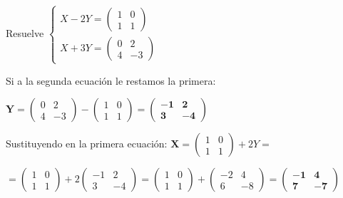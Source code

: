 \begin{ejem} Resuelve $\begin{cases} X-2Y=\left( \begin{matrix}  1&0\\1&1 \end{matrix} \right) \\ X+3Y=\left( \begin{matrix}  0&2\\4&-3 \end{matrix} \right) \end{cases}$ 

Si a la segunda ecuación le restamos la primera: 

$\boldsymbol{Y}=\left( \begin{matrix}  0&2\\4&-3 \end{matrix} \right) -\left( \begin{matrix}  1&0\\1&1 \end{matrix} \right)=\boldsymbol{ \left( \begin{matrix} -1&2 \\3&-4  \end{matrix}  \right)}$

Sustituyendo en la primera ecuación:
$\boldsymbol{ X}=\left( \begin{matrix}  1&0\\1&1 \end{matrix} \right)+2Y=$

$=\left( \begin{matrix}  1&0\\1&1 \end{matrix} \right)+2\left( \begin{matrix} -1&2 \\3&-4  \end{matrix}  \right)=
\left( \begin{matrix}  1&0\\1&1 \end{matrix} \right)
+\left( \begin{matrix} -2&4 \\6&-8  \end{matrix}  \right)=
\boldsymbol{ \left( \begin{matrix}  -1&4\\7&-7 \end{matrix} \right)}$

\end{ejem}

